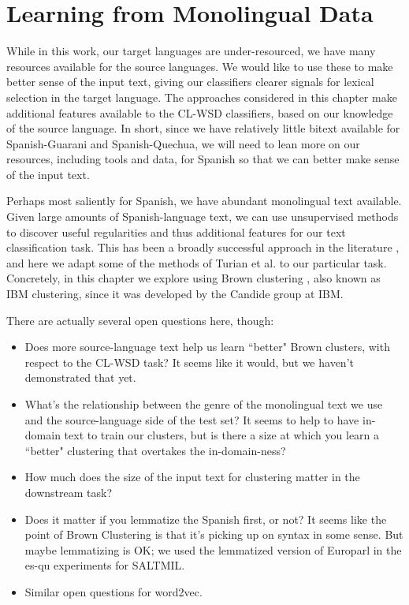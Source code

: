 \chapter{Learning from Monolingual Data}
\label{chap:monolingual}
While in this work, our target languages are under-resourced, we have many
resources available for the source languages. We would like to use these to
make better sense of the input text, giving our classifiers clearer signals for
lexical selection in the target language.
The approaches considered in this chapter make additional features available to
the CL-WSD classifiers, based on our knowledge of the source language.
In short, since we have relatively little bitext available for Spanish-Guarani
and Spanish-Quechua, we will need to lean more on our resources, including
tools and data, for Spanish so that we can better make sense of the input text.

Perhaps most saliently for Spanish, we have abundant monolingual text
available. Given large amounts of Spanish-language text, we can use
unsupervised methods to discover useful regularities and thus additional
features for our text classification task. This has been a broadly successful
approach in the literature \cite{turian-ratinov-bengio:2010:ACL}, and here we
adapt some of the methods of Turian et al. to our particular task. Concretely,
in this chapter we explore using Brown clustering \cite{brown1992class}, also
known as IBM clustering, since it was developed by the Candide group at IBM.

There are actually several open questions here, though:

\begin{itemize}
  \item Does more source-language text help us learn ``better" Brown clusters,
    with respect to the CL-WSD task? It seems like it would, but we haven't
    demonstrated that yet.
  \item What's the relationship between the genre of the monolingual text we
    use and the source-language side of the test set? It seems to help to have
    in-domain text to train our clusters, but is there a size at which you
    learn a ``better" clustering that overtakes the in-domain-ness?
  \item How much does the size of the input text for clustering matter in the
  downstream task?
  \item Does it matter if you lemmatize the Spanish first, or not? It seems
    like the point of Brown Clustering is that it's picking up on syntax in
    some sense. But maybe lemmatizing is OK; we used the lemmatized version of
    Europarl in the es-qu experiments for SALTMIL.
  \item Similar open questions for word2vec.
\end{itemize}

